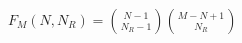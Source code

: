 \documentclass{standalone}
\begin{document}
$F_M(N, N_R) = {N-1 \choose N_R-1}{M-N+1 \choose N_R}$\\
\end{document}
